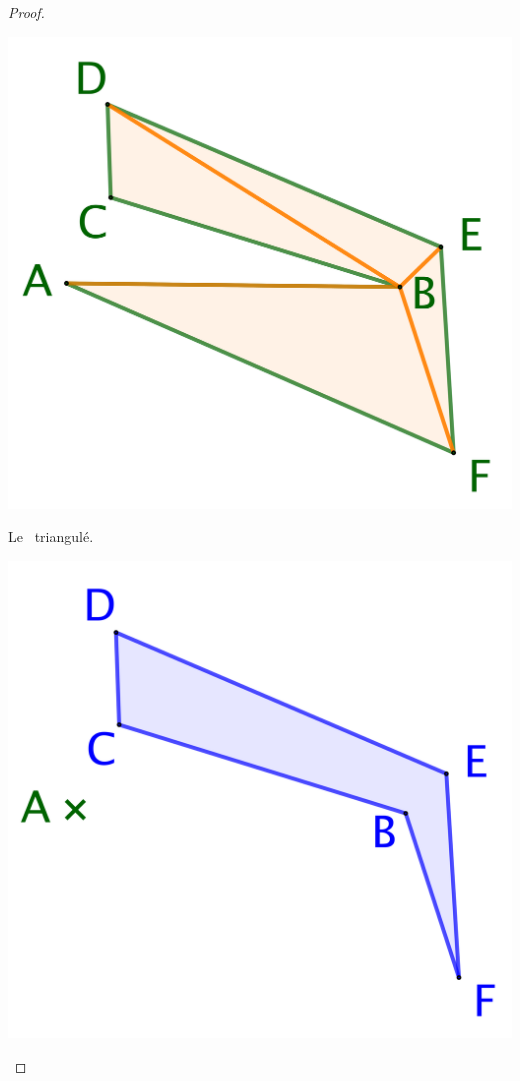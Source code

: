 \begin{proof}
\begin{multicols}{3}
    
        \begin{center}
            \includegraphics[scale=.4]{content/polygon/sufficient-cond/triangulation-2.png}
        
            \smallskip
            Le \ngone\ triangulé.
        \end{center}

    
        \begin{center}
            \includegraphics[scale=.4]{content/polygon/sufficient-cond/triangulation-3.png}
        

\end{center}
\end{multicols}
\end{proof}
